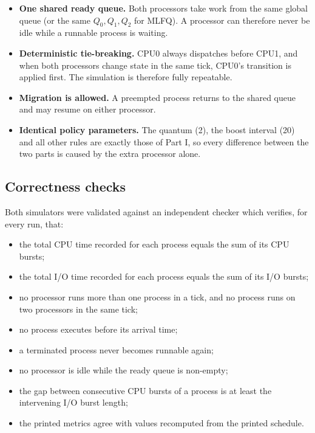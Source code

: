 \documentclass[11pt,a4paper]{article}
\begin{document}
\begin{itemize}\itemsep1pt
  \item \textbf{One shared ready queue.} Both processors take work from the same global
        queue (or the same $Q_0,Q_1,Q_2$ for MLFQ). A processor can therefore never be
        idle while a runnable process is waiting.
  \item \textbf{Deterministic tie-breaking.} CPU0 always dispatches before CPU1, and when
        both processors change state in the same tick, CPU0's transition is applied
        first. The simulation is therefore fully repeatable.
  \item \textbf{Migration is allowed.} A preempted process returns to the shared queue and
        may resume on either processor.
  \item \textbf{Identical policy parameters.} The quantum (2), the boost interval (20) and
        all other rules are exactly those of Part I, so every difference between the two
        parts is caused by the extra processor alone.
\end{itemize}

\subsection{Correctness checks}

Both simulators were validated against an independent checker which verifies, for every
run, that:

\begin{itemize}\itemsep1pt
  \item the total CPU time recorded for each process equals the sum of its CPU bursts;
  \item the total I/O time recorded for each process equals the sum of its I/O bursts;
  \item no processor runs more than one process in a tick, and no process runs on two
        processors in the same tick;
  \item no process executes before its arrival time;
  \item a terminated process never becomes runnable again;
  \item no processor is idle while the ready queue is non-empty;
  \item the gap between consecutive CPU bursts of a process is at least the intervening
        I/O burst length;
  \item the printed metrics agree with values recomputed from the printed schedule.
\end{itemize}
\end{document}

